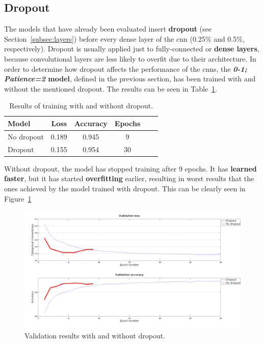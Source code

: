 \subsection{Dropout}
The models that have already been evaluated insert \textbf{dropout} (see Section~\ref{subsec:layers}) before every dense layer of the \gls{cnn} (0.25\% and 0.5\%, respectively). Dropout is usually applied just to fully-connected or \textbf{dense layers}, because convolutional layers are less likely to overfit due to their architecture. In order to determine how dropout affects the performance of the \glspl{cnn}, the \textbf{\textit{0-1; Patience=2} model}, defined in the previous section, has been trained with and without the mentioned dropout. The results can be seen in Table~\ref{tbl:dropout}. 
\begin{table}
	\centering
	\begin{tabular}{l*{4}{c}r}
		\textbf{Model} & \textbf{Loss} & \textbf{Accuracy} & \textbf{Epochs} \\
		\hline
		No dropout & 0.189 & 0.945 & 9 \\
		Dropout & 0.155 & 0.954 & 30 \\
	\end{tabular}
	\caption{Results of training with and without dropout.}
	\label{tbl:dropout}
\end{table}

Without dropout, the model has stopped training after 9 epochs. It has \textbf{learned faster}, but it has started \textbf{overfitting} earlier, resulting in worst results that the ones achieved by the model trained with dropout. This can be clearly seen in Figure~\ref{fig:comp_dropout}
\begin{figure}
	\centering
	\includegraphics[width=1\linewidth, keepaspectratio]{figures/comp_dropout.png}
	\caption{Validation results with and without dropout.}
	\label{fig:comp_dropout}
\end{figure}

